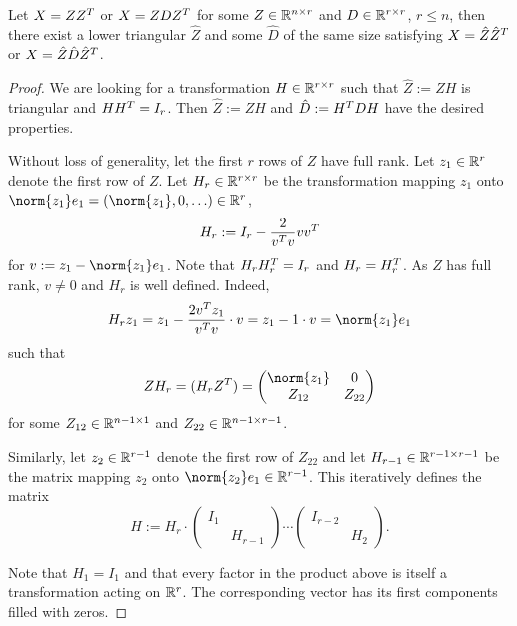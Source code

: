 \begin{proposition}
  Let $X=ZZ^T$ or $X=ZDZ^T$ for some $Z\in\mathbb{R}^{n\times r}$ and $D\in\mathbb{R}^{r\times r}$,
  $r \leq n$,
  then there exist a lower triangular $\hat{Z}$
  and some $\hat D$ of the same size satisfying
  $X=\hat Z \hat Z^T$
  or $X=\hat Z \hat D \hat Z^T$.
\end{proposition}
\begin{proof}
  We are looking for a transformation $H\in\mathbb{R}^{r\times r}$ such that $\hat Z := ZH$ is triangular and $HH^T = I_r$.
  Then $\hat Z := ZH$ and $\hat D := H^T DH$ have the desired properties.

  Without loss of generality, let the first $r$ rows of $Z$ have full rank.
  Let $z_1\in\mathbb{R}^r$ denote the first row of $Z$.
  Let $H_r\in\mathbb{R}^{r\times r}$ be the \Householder transformation mapping
  $z_1$ onto $\norm{z_1}e_1 = (\norm{z_1},0,\ldots) \in \R^r$, \ie
  \begin{equation}
    H_r := I_r - \frac{2}{v^T v} vv^T
  \end{equation}
  for $v := z_1 - \norm{z_1}e_1$.
  Note that $H_r H_r^T = I_r$ and $H_r = H_r^T$.
  As $Z$ has full rank, $v \neq 0$ and $H_r$ is well defined.
  Indeed,
  \begin{equation*}
    H_r z_1
    = z_1 - \frac{2v^\T z_1}{v^\T v} \cdot v
    = z_1 - 1 \cdot v
    = \norm{z_1}e_1
  \end{equation*}
  such that
  \begin{equation}
    Z H_r = (H_r Z^\T) = \begin{pmatrix}
      \norm{z_1} & 0 \\
      Z_{12} & Z_{22}
    \end{pmatrix}
  \end{equation}
  for some $Z_{12} \in \mathbb{R}^{n-1 \times 1}$ and $Z_{22} \in \mathbb{R}^{n-1 \times r-1}$.

  Similarly, let $z_2\in\mathbb{R}^{r-1}$ denote the first row of $Z_{22}$ and
  let $H_{r-1} \in \mathbb{R}^{r-1 \times r-1}$ be the \Householder matrix mapping
  $z_2$ onto $\norm{z_2}e_1 \in\R^{r-1}$.
  This iteratively defines the matrix
  \begin{equation}
    H :=
    H_r \cdot
    \begin{pmatrix}
      I_1 \\ & H_{r-1}
    \end{pmatrix}
    \cdots
    \begin{pmatrix}
      I_{r-2} \\ & H_2
    \end{pmatrix}
    .
  \end{equation}

  Note that $H_1 = I_1$ and
  that every factor in the product above is itself a \Householder transformation acting on $\mathbb{R}^r$.
  The corresponding vector has its first components filled with zeros.
\end{proof}

